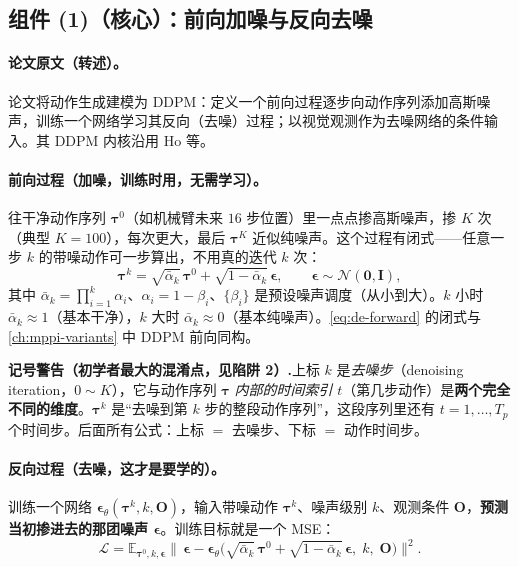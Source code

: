\subsection{组件 (1)（核心）：前向加噪与反向去噪}
\label{sec:de-ddpm}

\paragraph{论文原文（转述）。}
论文将动作生成建模为 DDPM：定义一个前向过程逐步向动作序列添加高斯噪声，训练一个网络学习其反向（去噪）过程；以视觉观测作为去噪网络的条件输入\cite{chi2023diffusion}。其 DDPM 内核沿用 Ho 等\cite{ho2020ddpm}。

\paragraph{前向过程（加噪，训练时用，无需学习）。}
往干净动作序列 $\boldsymbol{\tau}^0$（如机械臂未来 $16$ 步位置）里一点点掺高斯噪声，掺 $K$ 次（典型 $K=100$），每次更大，最后 $\boldsymbol{\tau}^K$ 近似纯噪声。这个过程有闭式——任意一步 $k$ 的带噪动作可一步算出，不用真的迭代 $k$ 次：
\begin{equation}
  \boldsymbol{\tau}^k=\sqrt{\bar\alpha_k}\,\boldsymbol{\tau}^0+\sqrt{1-\bar\alpha_k}\,\boldsymbol{\epsilon},\qquad \boldsymbol{\epsilon}\sim\mathcal{N}(\mathbf{0},\mathbf{I}),
  \label{eq:de-forward}
\end{equation}
其中 $\bar\alpha_k=\prod_{i=1}^{k}\alpha_i$、$\alpha_i=1-\beta_i$、$\{\beta_i\}$ 是预设噪声调度（从小到大）。$k$ 小时 $\bar\alpha_k\approx1$（基本干净），$k$ 大时 $\bar\alpha_k\approx0$（基本纯噪声）。\cref{eq:de-forward} 的闭式与 \cref{ch:mppi-variants} 中 DDPM 前向同构。

\begin{note}
\textbf{记号警告（初学者最大的混淆点，见陷阱 2）.}\;上标 $k$ 是\emph{去噪步}（denoising iteration，$0\sim K$），它与动作序列 $\boldsymbol{\tau}$ \emph{内部的时间索引} $t$（第几步动作）是\textbf{两个完全不同的维度}。$\boldsymbol{\tau}^k$ 是“去噪到第 $k$ 步的整段动作序列”，这段序列里还有 $t=1,\dots,T_p$ 个时间步。后面所有公式：上标 $=$ 去噪步、下标 $=$ 动作时间步。
\end{note}

\paragraph{反向过程（去噪，这才是要学的）。}
训练一个网络 $\boldsymbol{\epsilon}_\theta(\boldsymbol{\tau}^k,k,\mathbf{O})$，输入带噪动作 $\boldsymbol{\tau}^k$、噪声级别 $k$、观测条件 $\mathbf{O}$，\textbf{预测当初掺进去的那团噪声 $\boldsymbol{\epsilon}$}。训练目标就是一个 MSE：
\begin{equation}
  \mathcal{L}=\mathbb{E}_{\boldsymbol{\tau}^0,k,\boldsymbol{\epsilon}}\big\|\,\boldsymbol{\epsilon}-\boldsymbol{\epsilon}_\theta\big(\sqrt{\bar\alpha_k}\,\boldsymbol{\tau}^0+\sqrt{1-\bar\alpha_k}\,\boldsymbol{\epsilon},\;k,\;\mathbf{O}\big)\big\|^2.
  \label{eq:de-loss}
\end{equation}

